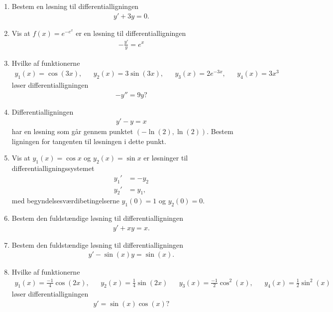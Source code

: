 \begin{enumerate}
	\item Bestem en løsning til differentialligningen
	\begin{align*}
	y'+3y=0.
	\end{align*}
	
	\item Vis at $ f(x)=e^{-e^x} $ er en løsning til differentialligningen
	\begin{align*}
	-\frac{y'}{y}=e^x
	\end{align*}
	
	\item Hvilke af funktionerne
	\begin{align*}
	y_1(x)=\cos(3x),&&y_2(x)=3\sin(3x),&& y_3(x)=2e^{-3x},&& y_4(x)=3x^3
	\end{align*}
	løser differentialligningen
	\begin{align*}
	-y''=9y?
	\end{align*}
	
	\item Differentialligningen 
	\begin{align*}
	y'-y=x
	\end{align*}
	har en løsning som går gennem punktet $(-\ln(2),\ln(2))$. Bestem ligningen for tangenten til løsningen i dette punkt.
	
	\item Vis at $y_1(x)=\cos x$ og $y_2(x)=\sin x$ er løsninger til differentialligningssystemet
	\begin{align*}
	y_1'&=-y_2\\
	y_2'&=y_1,
	\end{align*}
	med begyndelsesværdibetingelserne $y_1(0)=1$ og $y_2(0)=0$. 
	
	\item Bestem den fuldstændige løsning til differentialligningen
	\begin{align*}
	y'+xy=x.
	\end{align*}
	
	\item Bestem den fuldstændige løsning til differentialligningen
	\begin{align*}
	y'-\sin(x)y=\sin(x).
	\end{align*}
	
	\item Hvilke af funktionerne
	\begin{align*}
	y_1(x)=\frac{-1}{4}\cos(2x),&& y_2(x)=\frac{1}{4}\sin(2x)&& y_3(x)=\frac{-1}{2}\cos^2(x),&& y_4(x)=\frac{1}{2}\sin^2(x)
	\end{align*}
	 løser differentialligningen
	\begin{align*}
	y'=\sin(x)\cos(x)?
	\end{align*}
	

\end{enumerate}

